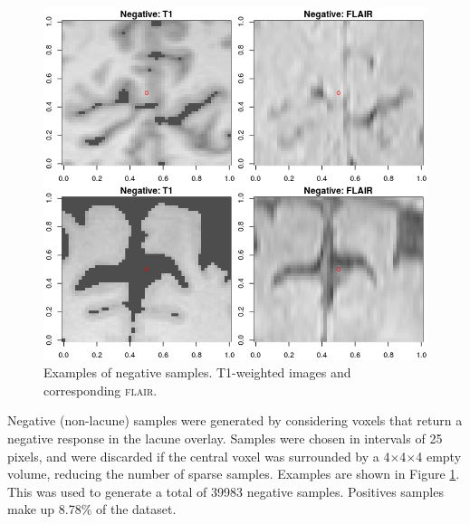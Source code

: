 \begin{figure}[ht]
\centering
\includegraphics[width=\linewidth]{Images/6_negatives.png}
\caption{Examples of negative samples. T1-weighted images and corresponding \textsc{flair}.}
\label{data-negatives}
\end{figure}

Negative (non-lacune) samples were generated by considering voxels that return a negative response in the lacune overlay. Samples were chosen in intervals of 25 pixels, and were discarded if the central voxel was surrounded by a 4$\times$4$\times$4 empty volume, reducing the number of sparse samples. Examples are shown in Figure \ref{data-negatives}. This was used to generate a total of 39983 negative samples. Positives samples make up 8.78\% of the dataset.

%
%
%
%

